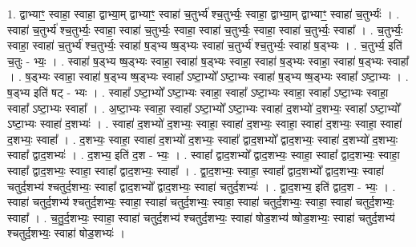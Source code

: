 \documentclass[17pt]{extarticle}
\begin{document}
1. द्वाभ्याꣳ॒॒ स्वाहा॒ स्वाहा॒ द्वाभ्या॒म् द्वाभ्याꣳ॒॒ स्वाहा॑ च॒तुर्भ्य॑ श्च॒तुर्भ्यः॒ स्वाहा॒ द्वाभ्या॒म् द्वाभ्याꣳ॒॒ स्वाहा॑ च॒तुर्भ्यः॑ । . स्वाहा॑ च॒तुर्भ्य॑ श्च॒तुर्भ्यः॒ स्वाहा॒ स्वाहा॑ च॒तुर्भ्यः॒ स्वाहा॒ स्वाहा॑ च॒तुर्भ्यः॒ स्वाहा॒ स्वाहा॑ च॒तुर्भ्यः॒ स्वाहा᳚ । . च॒तुर्भ्यः॒ स्वाहा॒ स्वाहा॑ च॒तुर्भ्य॑ श्च॒तुर्भ्यः॒ स्वाहा॑ ष॒ड्भ्य ष्ष॒ड्भ्यः स्वाहा॑ च॒तुर्भ्य॑ श्च॒तुर्भ्यः॒ स्वाहा॑ ष॒ड्भ्यः । . च॒तुर्भ्य॒ इति॑ च॒तुः - भ्यः॒ । . स्वाहा॑ ष॒ड्भ्य ष्ष॒ड्भ्यः स्वाहा॒ स्वाहा॑ ष॒ड्भ्यः स्वाहा॒ स्वाहा॑ ष॒ड्भ्यः स्वाहा॒ स्वाहा॑ ष॒ड्भ्यः स्वाहा᳚ । . ष॒ड्भ्यः स्वाहा॒ स्वाहा॑ ष॒ड्भ्य ष्ष॒ड्भ्यः स्वाहा᳚ ऽष्टा॒भ्यो᳚ ऽष्टा॒भ्यः स्वाहा॑ ष॒ड्भ्य ष्ष॒ड्भ्यः स्वाहा᳚ ऽष्टा॒भ्यः । . ष॒ड्भ्य इति॑ षट् - भ्यः । . स्वाहा᳚ ऽष्टा॒भ्यो᳚ ऽष्टा॒भ्यः स्वाहा॒ स्वाहा᳚ ऽष्टा॒भ्यः स्वाहा॒ स्वाहा᳚ ऽष्टा॒भ्यः स्वाहा॒ स्वाहा᳚ ऽष्टा॒भ्यः स्वाहा᳚ । . अ॒ष्टा॒भ्यः स्वाहा॒ स्वाहा᳚ ऽष्टा॒भ्यो᳚ ऽष्टा॒भ्यः स्वाहा॑ द॒शभ्यो॑ द॒शभ्यः॒ स्वाहा᳚ ऽष्टा॒भ्यो᳚ ऽष्टा॒भ्यः स्वाहा॑ द॒शभ्यः॑ । . स्वाहा॑ द॒शभ्यो॑ द॒शभ्यः॒ स्वाहा॒ स्वाहा॑ द॒शभ्यः॒ स्वाहा॒ स्वाहा॑ द॒शभ्यः॒ स्वाहा॒ स्वाहा॑ द॒शभ्यः॒ स्वाहा᳚ । . द॒शभ्यः॒ स्वाहा॒ स्वाहा॑ द॒शभ्यो॑ द॒शभ्यः॒ स्वाहा᳚ द्वाद॒शभ्यो᳚ द्वाद॒शभ्यः॒ स्वाहा॑ द॒शभ्यो॑ द॒शभ्यः॒ स्वाहा᳚ द्वाद॒शभ्यः॑ । . द॒शभ्य॒ इति॑ द॒श - भ्यः॒ । . स्वाहा᳚ द्वाद॒शभ्यो᳚ द्वाद॒शभ्यः॒ स्वाहा॒ स्वाहा᳚ द्वाद॒शभ्यः॒ स्वाहा॒ स्वाहा᳚ द्वाद॒शभ्यः॒ स्वाहा॒ स्वाहा᳚ द्वाद॒शभ्यः॒ स्वाहा᳚ । . द्वा॒द॒शभ्यः॒ स्वाहा॒ स्वाहा᳚ द्वाद॒शभ्यो᳚ द्वाद॒शभ्यः॒ स्वाहा॑ चतुर्द॒शभ्य॑ श्चतुर्द॒शभ्यः॒ स्वाहा᳚ द्वाद॒शभ्यो᳚ द्वाद॒शभ्यः॒ स्वाहा॑ चतुर्द॒शभ्यः॑ । . द्वा॒द॒शभ्य॒ इति॑ द्वाद॒श - भ्यः॒ । . स्वाहा॑ चतुर्द॒शभ्य॑ श्चतुर्द॒शभ्यः॒ स्वाहा॒ स्वाहा॑ चतुर्द॒शभ्यः॒ स्वाहा॒ स्वाहा॑ चतुर्द॒शभ्यः॒ स्वाहा॒ स्वाहा॑ चतुर्द॒शभ्यः॒ स्वाहा᳚ । . च॒तु॒र्द॒शभ्यः॒ स्वाहा॒ स्वाहा॑ चतुर्द॒शभ्य॑ श्चतुर्द॒शभ्यः॒ स्वाहा॑ षोड॒शभ्य॑ ष्षोड॒शभ्यः॒ स्वाहा॑ चतुर्द॒शभ्य॑ श्चतुर्द॒शभ्यः॒ स्वाहा॑ षोड॒शभ्यः॑ । \newline
\end{document}
